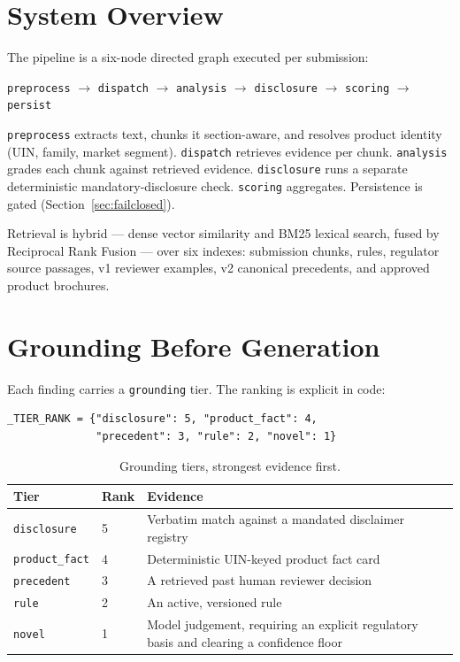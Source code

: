 \documentclass[10pt]{article}
\newcommand{\code}[1]{\texttt{\small #1}}
\begin{document}
\section{System Overview}

The pipeline is a six-node directed graph executed per submission:

\begin{center}
\code{preprocess} $\rightarrow$ \code{dispatch} $\rightarrow$ \code{analysis}
$\rightarrow$ \code{disclosure} $\rightarrow$ \code{scoring} $\rightarrow$ \code{persist}
\end{center}

\code{preprocess} extracts text, chunks it section-aware, and resolves product
identity (UIN, family, market segment). \code{dispatch} retrieves evidence per
chunk. \code{analysis} grades each chunk against retrieved evidence.
\code{disclosure} runs a separate deterministic mandatory-disclosure check.
\code{scoring} aggregates. Persistence is gated (Section~\ref{sec:failclosed}).

Retrieval is hybrid --- dense vector similarity and BM25 lexical search, fused
by Reciprocal Rank Fusion --- over six indexes: submission chunks, rules,
regulator source passages, v1 reviewer examples, v2 canonical precedents, and
approved product brochures.

\section{Grounding Before Generation}
\label{sec:grounding}

Each finding carries a \code{grounding} tier. The ranking is explicit in code:

\begin{lstlisting}
_TIER_RANK = {"disclosure": 5, "product_fact": 4,
              "precedent": 3, "rule": 2, "novel": 1}
\end{lstlisting}

\begin{table}[htbp]
\centering
\caption{Grounding tiers, strongest evidence first.}
\begin{tabular}{@{}llp{6.6cm}@{}}
\toprule
\textbf{Tier} & \textbf{Rank} & \textbf{Evidence} \\
\midrule
\code{disclosure}   & 5 & Verbatim match against a mandated disclaimer registry \\
\code{product\_fact} & 4 & Deterministic UIN-keyed product fact card \\
\code{precedent}    & 3 & A retrieved past human reviewer decision \\
\code{rule}         & 2 & An active, versioned rule \\
\code{novel}        & 1 & Model judgement, requiring an explicit regulatory basis and clearing a confidence floor \\
\bottomrule
\end{tabular}
\end{table}
\end{document}
